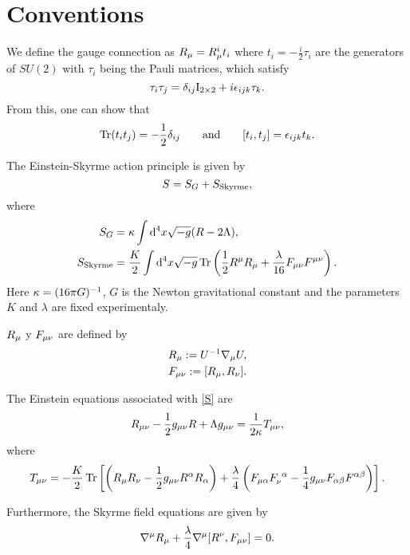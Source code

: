 \section{Conventions}
We define the gauge connection as $R_\mu =R_\mu^{i}t_i$ where $t_i=-\frac{i}{2}\tau_i$  are the generators of $SU(2)$ with $\tau_i$ being the Pauli matrices, which satisfy
\begin{equation}
  \tau_i\tau_j=\delta_{ij}\mathrm{I}_{2\times 2} +i\epsilon_{ijk}\tau_k.
\end{equation}
From this, one can show that 
\begin{equation}
  \Tr(t_it_j)=-\frac{1}{2}\delta_{ij}\qquad \text{and}\qquad [t_i,t_j]=\epsilon_{ijk}t_k.
\end{equation}

The Einstein-Skyrme action principle is given by
\begin{equation}\label{S}
  S=S_G+S_{\rm Skyrme},
\end{equation}
where 
\begin{align}
  S_G&=\kappa\int\dd^4x\sqrt{-g}(R-2\Lambda),\\
  S_{\rm Skyrme}&=\frac{K}{2}\int\dd^4x\sqrt{-g}\Tr\left(\frac{1}{2}R^\mu R_\mu +\frac{\lambda}{16}F_{\mu\nu }F^{\mu\nu }\right).
\end{align}
Here $\kappa=(16\pi G)^{-1}$, $G$ is the Newton gravitational constant and the parameters $K$ and $\lambda$ are fixed experimentaly. 

$R_\mu $ y $F_{\mu\nu }$ are defined by
\begin{align}
  R_\mu :=U^{-1}\nabla_\mu U\label{R},\\
  F_{\mu\nu}:=[R_\mu, R_\nu ]\label{F}.
\end{align}

The Einstein equations associated with \eqref{S} are
\begin{equation}\label{Einstein-eqs}
  R_{\mu\nu }-\frac{1}{2}g_{\mu\nu}R +\Lambda g_{\mu\nu }=\frac{1}{2\kappa }T_{\mu\nu },
\end{equation}
where
\begin{equation}\label{Tmn}
  T_{\mu\nu }=-\frac{K}{2}\Tr\left[\left(R_\mu R_\nu -\frac{1}{2}g_{\mu\nu }R^\alpha R_\alpha \right)+\frac{\lambda}{4}\left(F_{\mu\alpha }F_\nu ^{~\alpha }-\frac{1}{4}g_{\mu\nu }F_{\alpha\beta }F^{\alpha\beta}\right)\right].
\end{equation}

Furthermore, the Skyrme field equations are given by
\begin{equation}\label{Skyrme-eqs}
  \nabla^\mu R_\mu +\frac{\lambda}{4}\nabla^\mu [R^\nu ,F_{\mu\nu }]=0.
\end{equation}

